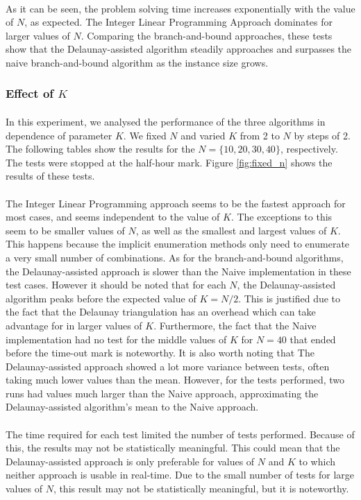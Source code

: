 \paragraph{}As it can be seen, the problem solving time increases exponentially with the value of $N$, as expected.
The Integer Linear Programming Approach dominates for larger values of $N$. Comparing the branch-and-bound approaches, these tests show that the Delaunay-assisted algorithm steadily approaches and surpasses the naive branch-and-bound algorithm as the instance size grows.
\subsubsection*{Effect of $K$}
\paragraph{}
In this experiment, we analysed the performance of the three algorithms in dependence of parameter $K$. We fixed $N$ and varied $K$ from 2 to $N$ by steps of 2. The following tables show the results for the $N=\{10,20,30,40\}$, respectively. The tests were stopped at the half-hour mark. Figure \ref{fig:fixed_n} shows the results of these tests.

\noindent
\paragraph{}
The Integer Linear Programming approach seems to be the fastest approach for most cases, and seems independent to the value of $K$. The exceptions to this seem to be smaller values of $N$, as well as the smallest and largest values of $K$. This happens because the implicit enumeration methods only need to enumerate a very small number of combinations.
As for the branch-and-bound algorithms, the Delaunay-assisted approach is slower than the Naive implementation in these test cases. However it should be noted that for each $N$, the Delaunay-assisted algorithm peaks before the expected value of $K=N/2$. This is justified due to the fact that the Delaunay triangulation has an overhead which can take advantage for in larger values of $K$.
Furthermore, the fact that the Naive implementation had no test for the middle values of $K$ for $N=40$ that ended before the time-out mark is noteworthy.
It is also worth noting that The Delaunay-assisted approach showed a lot more variance between tests, often taking much lower values than the mean. However, for the tests performed, two runs had values much larger than the Naive approach, approximating the Delaunay-assisted algorithm's mean to the Naive approach.
\paragraph{}
The time required for each test limited the number of tests performed. Because of this, the results may not be statistically meaningful. 
This could mean that the Delaunay-assisted approach is only preferable for values of $N$ and $K$ to which neither approach is usable in real-time. Due to the small number of tests for large values of $N$, this result may not be statistically meaningful, but it is noteworthy.
